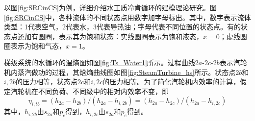   以图\ref{fig:SRCinCS}为例，详细介绍水工质冷肯循环的建模理论研究。图\ref{fig:SRCinCS}中，各种流体的不同状态点用数字加字母标出。其中，数字表示流体类型：1代表空气，2代表水，3代表导热油；字母代表不同位置的状态点。有的状态点还加有圆圈，表示其为饱和状态：实线圆圈表示为饱和液态，$x = 0$；虚线圆圈表示为饱和气态，$x = 1$。

梯级系统的水循环的温熵图如图\ref{fig:Ts_Water1}所示。过程曲线$2a$-$2c$-$2b$表示汽轮机内蒸汽做功的过程，其焓熵曲线图如图\ref{fig:SteamTurbine_hs}所示。状态点$2b$和$i,2b$的压力相等，状态点$2c$和$i,2c$的压力相等。为了简化汽轮机内效率的计算，假定汽轮机在不同负荷、不同级中的相对内效率不变，即
\begin{equation}
      \eta_{i,tb} =(h_{2a}-h_{2b})/(h_{2a}-h_{i,2b}) = (h_{2a}-h_{2c})/(h_{2a}-h_{i,2c})
\end{equation}
其中，$h_{i,2b}$由$s_{2a}$和$p_c$得到，$h_{i,2c}$由$s_{2a}$和$p_e$得到。


